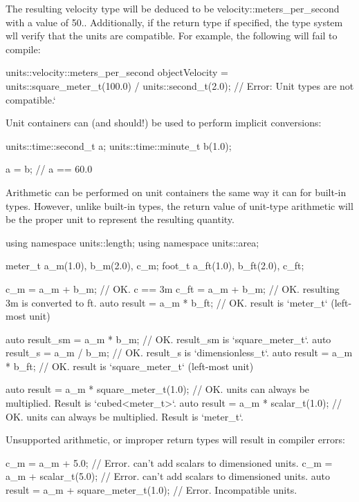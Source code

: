 The resulting velocity type will be deduced to be {\ttfamily velocity\+::meters\+\_\+per\+\_\+second} with a value of 50.. Additionally, if the return type if specified, the type system wll verify that the units are compatible. For example, the following will fail to compile\+: \begin{DoxyVerb}units::velocity::meters_per_second objectVelocity = units::square_meter_t(100.0) / units::second_t(2.0); // Error: Unit types are not compatible.`
\end{DoxyVerb}


Unit containers can (and should!) be used to perform implicit conversions\+: \begin{DoxyVerb}units::time::second_t a;
units::time::minute_t b(1.0);

a = b;  // a == 60.0
\end{DoxyVerb}


Arithmetic can be performed on unit containers the same way it can for built-\/in types. However, unlike built-\/in types, the return value of unit-\/type arithmetic will be the proper unit to represent the resulting quantity. \begin{DoxyVerb}using namespace units::length;
using namespace units::area;

meter_t a_m(1.0), b_m(2.0), c_m;
foot_t  a_ft(1.0), b_ft(2.0), c_ft;

c_m = a_m + b_m;                            // OK. c == 3m
c_ft = a_m + b_m;                           // OK. resulting 3m is converted to ft.
auto result = a_m * b_ft;                   // OK. result is `meter_t` (left-most unit)

auto result_sm = a_m * b_m;                 // OK. result_sm is `square_meter_t`.
auto result_s = a_m / b_m;                  // OK. result_s is `dimensionless_t`.
auto result = a_m * b_ft;                   // OK. result is `square_meter_t` (left-most unit)

auto result = a_m * square_meter_t(1.0);    // OK. units can always be multiplied. Result is `cubed<meter_t>`.
auto result = a_m * scalar_t(1.0);          // OK. units can always be multiplied. Result is `meter_t`.
\end{DoxyVerb}


Unsupported arithmetic, or improper return types will result in compiler errors\+: \begin{DoxyVerb}c_m = a_m + 5.0;                            // Error. can't add scalars to dimensioned units.
c_m = a_m + scalar_t(5.0);                  // Error. can't add scalars to dimensioned units.
auto result = a_m + square_meter_t(1.0);    // Error. Incompatible units.
\end{DoxyVerb}



